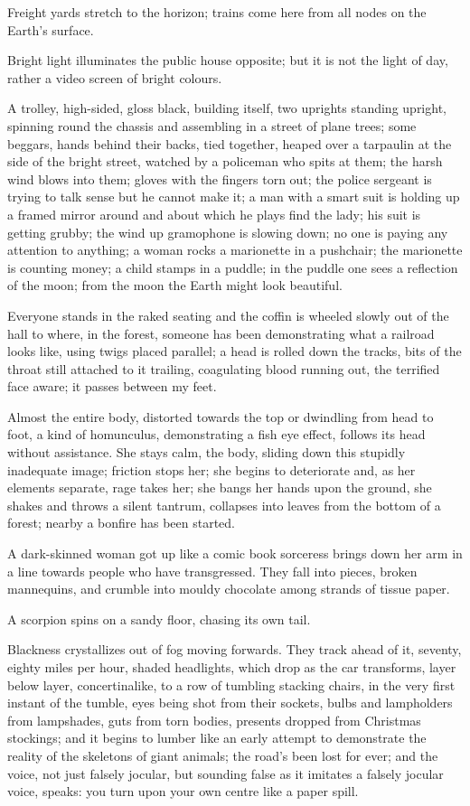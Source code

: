 \documentclass[
]{memoir}
\newlength{\drop}%
\begin{document}
Freight yards stretch to the horizon; trains come here from all nodes on
the Earth's surface.

Bright light illuminates the public house opposite; but it is not the
light of day, rather a video screen of bright colours.

A trolley, high-sided, gloss black, building itself, two uprights
standing upright, spinning round the chassis and assembling in a street
of plane trees; some beggars, hands behind their backs, tied together,
heaped over a tarpaulin at the side of the bright street, watched by a
policeman who spits at them; the harsh wind blows into them; gloves with
the fingers torn out; the police sergeant is trying to talk sense but he
cannot make it; a man with a smart suit is holding up a framed mirror
around and about which he plays find the lady; his suit is getting
grubby; the wind up gramophone is slowing down; no one is paying any
attention to anything; a woman rocks a marionette in a pushchair; the
marionette is counting money; a child stamps in a puddle; in the puddle
one sees a reflection of the moon; from the moon the Earth might look
beautiful.

Everyone stands in the raked seating and the coffin is wheeled slowly
out of the hall to where, in the forest, someone has been demonstrating
what a railroad looks like, using twigs placed parallel; a head is
rolled down the tracks, bits of the throat still attached to it
trailing, coagulating blood running out, the terrified face aware; it
passes between my feet.

Almost the entire body, distorted towards the top or dwindling from head
to foot, a kind of homunculus, demonstrating a fish eye effect, follows
its head without assistance. She stays calm, the body, sliding down this
stupidly inadequate image; friction stops her; she begins to deteriorate
and, as her elements separate, rage takes her; she bangs her hands upon
the ground, she shakes and throws a silent tantrum, collapses into
leaves from the bottom of a forest; nearby a bonfire has been started.

A dark-skinned woman got up like a comic book sorceress brings down her
arm in a line towards people who have transgressed. They fall into
pieces, broken mannequins, and crumble into mouldy chocolate among
strands of tissue paper.

A scorpion spins on a sandy floor, chasing its own tail.

Blackness crystallizes out of fog moving forwards. They track ahead of
it, seventy, eighty miles per hour, shaded headlights, which drop as the
car transforms, layer below layer, concertinalike, to a row of tumbling
stacking chairs, in the very first instant of the tumble, eyes being
shot from their sockets, bulbs and lampholders from lampshades, guts
from torn bodies, presents dropped from Christmas stockings; and it
begins to lumber like an early attempt to demonstrate the reality of the
skeletons of giant animals; the road's been lost for ever; and the
voice, not just falsely jocular, but sounding false as it imitates a
falsely jocular voice, speaks: you turn upon your own centre like a
paper spill.
\end{document}
